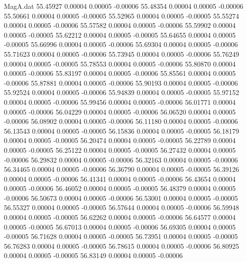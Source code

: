 \begin{filecontents}{MagA.dat}
  55.45927    0.00004    0.00005   -0.00006
  55.48354    0.00004    0.00005   -0.00006
  55.50661    0.00004    0.00005   -0.00005
  55.52965    0.00004    0.00005   -0.00005
  55.55274    0.00004    0.00005   -0.00006
  55.57582    0.00004    0.00005   -0.00006
  55.59902    0.00004    0.00005   -0.00005
  55.62212    0.00004    0.00005   -0.00005
  55.64655    0.00004    0.00005   -0.00005
  55.66996    0.00004    0.00005   -0.00006
  55.69304    0.00004    0.00005   -0.00006
  55.71623    0.00004    0.00005   -0.00006
  55.73945    0.00004    0.00005   -0.00006
  55.76249    0.00004    0.00005   -0.00005
  55.78553    0.00004    0.00005   -0.00006
  55.80870    0.00004    0.00005   -0.00006
  55.83197    0.00004    0.00005   -0.00006
  55.85561    0.00004    0.00005   -0.00006
  55.87881    0.00004    0.00005   -0.00006
  55.90193    0.00004    0.00005   -0.00006
  55.92524    0.00004    0.00005   -0.00006
  55.94839    0.00004    0.00005   -0.00005
  55.97152    0.00004    0.00005   -0.00006
  55.99456    0.00004    0.00005   -0.00006
  56.01771    0.00004    0.00005   -0.00006
  56.04229    0.00004    0.00005   -0.00006
  56.06520    0.00004    0.00005   -0.00006
  56.08902    0.00004    0.00005   -0.00006
  56.11180    0.00004    0.00005   -0.00006
  56.13543    0.00004    0.00005   -0.00005
  56.15836    0.00004    0.00005   -0.00005
  56.18179    0.00004    0.00005   -0.00005
  56.20474    0.00004    0.00005   -0.00005
  56.22789    0.00004    0.00005   -0.00005
  56.25122    0.00004    0.00005   -0.00005
  56.27432    0.00004    0.00005   -0.00006
  56.29832    0.00004    0.00005   -0.00006
  56.32163    0.00004    0.00005   -0.00006
  56.34465    0.00004    0.00005   -0.00006
  56.36790    0.00004    0.00005   -0.00005
  56.39126    0.00004    0.00005   -0.00006
  56.41341    0.00004    0.00005   -0.00006
  56.43654    0.00004    0.00005   -0.00006
  56.46052    0.00004    0.00005   -0.00005
  56.48379    0.00004    0.00005   -0.00006
  56.50673    0.00004    0.00005   -0.00006
  56.53001    0.00004    0.00005   -0.00005
  56.55327    0.00004    0.00005   -0.00005
  56.57644    0.00004    0.00005   -0.00006
  56.59948    0.00004    0.00005   -0.00005
  56.62262    0.00004    0.00005   -0.00006
  56.64577    0.00004    0.00005   -0.00005
  56.67013    0.00004    0.00005   -0.00006
  56.69305    0.00004    0.00005   -0.00005
  56.71628    0.00004    0.00005   -0.00005
  56.73951    0.00004    0.00005   -0.00005
  56.76283    0.00004    0.00005   -0.00005
  56.78615    0.00004    0.00005   -0.00006
  56.80925    0.00004    0.00005   -0.00005
  56.83149    0.00004    0.00005   -0.00006

\end{filecontents}
